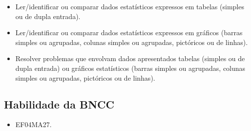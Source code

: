 \begin{itemize}
\item Ler/identificar ou comparar dados estatísticos expressos em tabelas
(simples ou de dupla entrada).

\item Ler/identificar ou comparar dados estatísticos expressos em gráficos
(barras simples ou agrupadas, colunas simples ou agrupadas, pictóricos
ou de linhas).

\item Resolver problemas que envolvam dados apresentados tabelas (simples ou
de dupla entrada) ou gráficos estatísticos (barras simples ou agrupadas,
colunas simples ou agrupadas, pictóricos ou de linhas).
\end{itemize}

\subsection{Habilidade da BNCC}

\begin{itemize}
\item EF04MA27.
\end{itemize}

